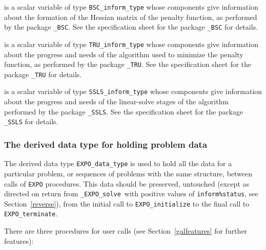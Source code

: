 \documentclass{galahad}
\newcommand{\packagename}{EXPO}
\newcommand{\fullpackagename}{\libraryname\_\packagename}
\newcommand{\solver}{{\tt \fullpackagename\_solve}}
\begin{document}
\begin{description}
 is a scalar variable of type
{\tt BSC\_inform\_type}
whose components give information about the formation of the Hessian matrix
of the penalty function, as performed by the package
{\tt \libraryname\_BSC}.
See the specification sheet for the package
{\tt \libraryname\_BSC}
for details.

 is a scalar variable of type
{\tt TRU\_inform\_type}
whose components give information about the progress and needs
of the algorithm used to minimize the penalty function, as performed
by the package
{\tt \libraryname\_TRU}.
See the specification sheet for the package
{\tt \libraryname\_TRU}
for details.

 is a scalar variable of type
{\tt SSLS\_inform\_type}
whose components give information about the progress and needs
of the linear-solve stages of the algorithm performed by the package
{\tt \libraryname\_SSLS}.
See the specification sheet for the package
{\tt \libraryname\_SSLS}
for details.

\end{description}


\subsubsection{The derived data type for holding problem data}\label{typedata}
The derived data type
{\tt \packagename\_data\_type}
is used to hold all the data for a particular problem,
or sequences of problems with the same structure, between calls of
{\tt \packagename} procedures.
This data should be preserved, untouched (except as directed on
return from \solver\ with positive values of {\tt inform\%status}, see
Section~\ref{reverse}),
from the initial call to
{\tt \packagename\_initialize}
to the final call to
{\tt \packagename\_terminate}.





\galarguments
There are three procedures for user calls
(see Section~\ref{galfeatures} for further features):
\end{document}
